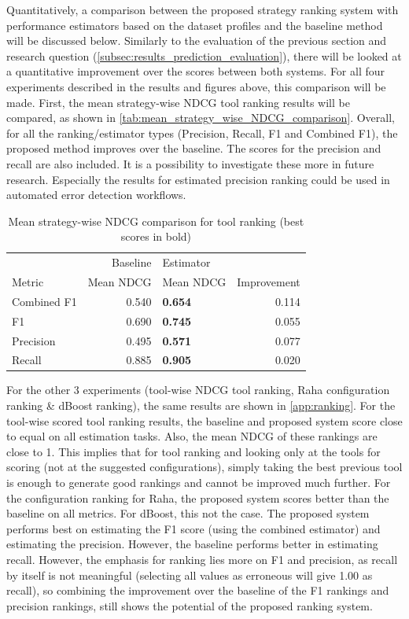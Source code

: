Quantitatively, a comparison between the proposed strategy ranking system with performance estimators based on the dataset profiles and the baseline method will be discussed below. Similarly to the evaluation of the previous section and research question (\autoref{subsec:results_prediction_evaluation}), there will be looked at a quantitative improvement over the scores between both systems. For all four experiments described in the results and figures above, this comparison will be made. 
First, the mean strategy-wise NDCG tool ranking results will be compared, as shown in \autoref{tab:mean_strategy_wise_NDCG_comparison}. Overall, for all the ranking/estimator types (Precision, Recall, F1 and Combined F1), the proposed method improves over the baseline. The scores for the precision and recall are also included. It is a possibility to investigate these more in future research. Especially the results for estimated precision ranking could be used in automated error detection workflows. 

\begin{table}[H]
\centering
\begin{tabular}{lrlr}
\toprule
{} &  Baseline &  Estimator &   \\
Metric          & Mean NDCG  &  Mean NDCG  &       Improvement       \\
\midrule
Combined F1 &          0.540 &  \textbf{0.654} &        0.114 \\
F1          &          0.690 &  \textbf{0.745} &        0.055 \\
Precision   &          0.495 &  \textbf{0.571} &        0.077 \\
Recall      &          0.885 &  \textbf{0.905} &        0.020 \\
\bottomrule
\end{tabular}
\caption{Mean strategy-wise NDCG comparison for tool ranking (best scores in bold)}
\label{tab:mean_strategy_wise_NDCG_comparison}
\end{table}


For the other 3 experiments (tool-wise NDCG tool ranking, Raha configuration ranking \& dBoost ranking), the same results are shown in \autoref{app:ranking}. For the tool-wise scored tool ranking results, the baseline and proposed system score close to equal on all estimation tasks. Also, the mean NDCG of these rankings are close to 1. This implies that for tool ranking and looking only at the tools for scoring (not at the suggested configurations), simply taking the best previous tool is enough to generate good rankings and cannot be improved much further. 
For the configuration ranking for Raha, the proposed system scores better than the baseline on all metrics. 
For dBoost, this not the case. The proposed system performs best on estimating the F1 score (using the combined estimator) and estimating the precision. However, the baseline performs better in estimating recall. However, the emphasis for ranking lies more on F1 and precision, as recall by itself is not meaningful (selecting all values as erroneous will give 1.00 as recall), so combining the improvement over the baseline of the F1 rankings and precision rankings, still shows the potential of the proposed ranking system.

